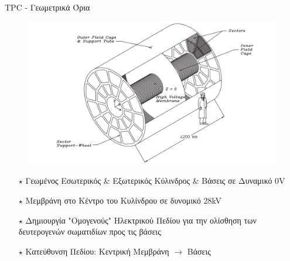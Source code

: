 \documentclass[18pt,notheorems,hyperref={pdfauthor=whatever}]{beamer}
\begin{document}
\begin{frame}{TPC - Γεωμετρικά Όρια}
    \begin{minipage}{0.55\textwidth}
        \begin{figure}
            \centering
            \includegraphics[scale=0.4]{images/TPC_sketch.png}
        \end{figure}
    \end{minipage}
     \begin{minipage}{0.4\textwidth}
        \begin{itemize}
            \item[$\star$] Γεωμένος Εσωτερικός \& Εξωτερικός Κύλινδρος \& Βάσεις σε Δυναμικό 0V
            \item[$\star$] Μεμβράνη στο Κέντρο του Κυλίνδρου σε δυνομικό 28kV
            \item[$\star$] Δημιουργία "Ομογενούς" Ηλεκτρικού Πεδίου για την ολίσθηση των δευτερογενών σωματιδίων προς τις βάσεις 
            \item[$\star$] Κατεύθυνση Πεδίου: Κεντρική Μεμβράνη $\rightarrow$  Βάσεις 
        \end{itemize}
    \end{minipage}
\end{frame}
\end{document}
